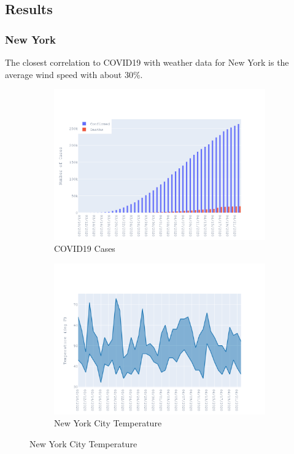 \documentclass{homework}
\begin{document}
\newpage
\subsection{Results}
\subsubsection{New York}

The closest correlation to COVID19 with weather data for New York is the average wind speed with about 30\%.

\begin{figure}[H]
  \centering
  \begin{subfigure}{0.45\linewidth}
    \includegraphics[width=\linewidth]{task4/New York_cases.png}
    \caption{COVID19 Cases}
  \end{subfigure}
  \hfil
  \begin{subfigure}{0.45\linewidth}
    \includegraphics[width=\linewidth]{task4/New York_temp.png}
    \caption{New York City Temperature}
  \end{subfigure}


\end{figure}
\end{document}
